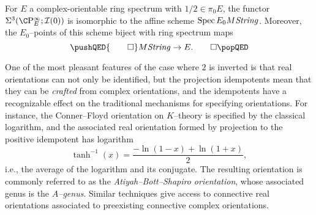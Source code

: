 \begin{corollary}\label{OddPrimaryMStringTriumvirate}
For \(E\) a complex-orientable ring spectrum with \(1/2 \in \pi_0 E\), the functor \(\Sigma^3(\CP^\infty_E; \sheaf I(0))\) is isomorphic to the affine scheme \(\operatorname{Spec} E_0 M\mathit{String}\).  Moreover, the \(E_0\)--points of this scheme biject with ring spectrum maps \[\pushQED{\qed}M\String \to E. \qedhere \popQED\]
\end{corollary}

\begin{remark}
One of the most pleasant features of the case where \(2\) is inverted is that real orientations can not only be identified, but the projection idempotents mean that they can be \emph{crafted} from complex orientations, and the idempotents have a recognizable effect on the traditional mechanisms for specifying orientations.  For instance, the Conner--Floyd orientation on \(K\)--theory is specified by the classical logarithm, and the associated real orientation formed by projection to the positive idempotent has logarithm \[\operatorname{tanh}^{-1}(x) = \frac{-\ln(1 - x) + \ln(1 + x)}{2},\] i.e., the average of the logarithm and its conjugate.  The resulting orientation is commonly referred to as the \textit{Atiyah--Bott--Shapiro orientation}, whose associated genus is the \textit{\(\widehat A\)--genus}.  Similar techniques give access to connective real orientations associated to preexisting connective complex orientations.
\end{remark}

